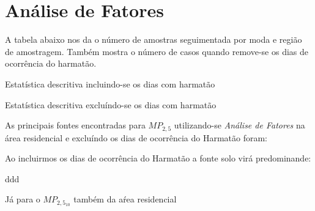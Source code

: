 \section{Análise de Fatores}

A tabela abaixo nos da o número de amostras seguimentada por
moda e região de amostragem. 
Também mostra o número de casos quando remove-se os dias de ocorrência do harmatão.

\begin{table}[H]
 \centering
  
  \caption{Estatística descritiva incluindo-se os dias com harmatão}
\end{table}

\begin{table}[H]
  \centering
  
  \caption{Estatística descritiva excluíndo-se os dias com harmatão}
\end{table}


As principais fontes encontradas para $MP_{2,5}$ utilizando-se
\textit{Análise de Fatores} na área residencial e excluíndo os dias
de ocorrência do Harmatão foram: 



Ao incluirmos os dias de ocorrência do Harmatão a fonte solo
virá predominande:

\begin{table}[H]
  \centering
  
  \caption{ddd}
\end{table}

Já para o $MP_{2,5_10}$ também da aŕea residencial 


%
%
%
%
